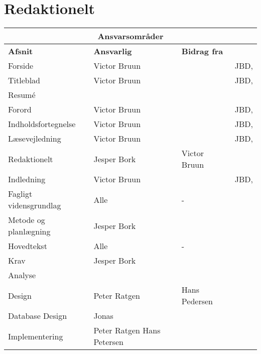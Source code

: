 \clearpage
\section{Redaktionelt}
\vfuzz=100pt
\hfuzz=100pt

\begin{table}[h!]
\centering
\label{tab:1}
    \begin{tabular}{|p{45mm}|p{30mm}|p{30mm}|p{35mm}|} \hline
    \multicolumn{4}{|c|}{\textbf{Ansvarsområder}} \\ \hline
        \textbf{Afsnit}        & \textbf{Ansvarlig} & \textbf{Bidrag fra} &\textbf{\raggedright Kontrolleret af}  \\\hline
        Forside                & Victor Bruun     &          & JBD, \\ \hline
        Titleblad              & Victor Bruun     &          & JBD, \\ \hline
        Resumé                 &                  &          &  \\ \hline
        Forord                 & Victor Bruun     &          & JBD,  \\ \hline
        Indholdsfortegnelse    & Victor Bruun     &          & JBD, \\ \hline
        Læsevejledning         & Victor Bruun     &          & JBD,  \\ \hline
        Redaktionelt           & Jesper Bork      & Victor Bruun         &  \\ \hline
        Indledning             & Victor Bruun     &          & JBD, \\ \hline
        Fagligt vidensgrundlag & Alle             & -        &  \\ \hline
        Metode og planlægning  & Jesper Bork      &          &  \\ \hline
        Hovedtekst             & Alle             & -        &  \\ \hline
        Krav                   & Jesper Bork      &          &  \\ \hline
        Analyse                &                  &              &  \\ \hline
        Design                 & Peter Ratgen     & Hans Pedersen&  \\ \hline
        Database Design        & Jonas            &          &  \\ \hline
        Implementering         & Peter Ratgen \newline 
                                 Hans Petersen \newline

\end{tabular}
\end{table}
